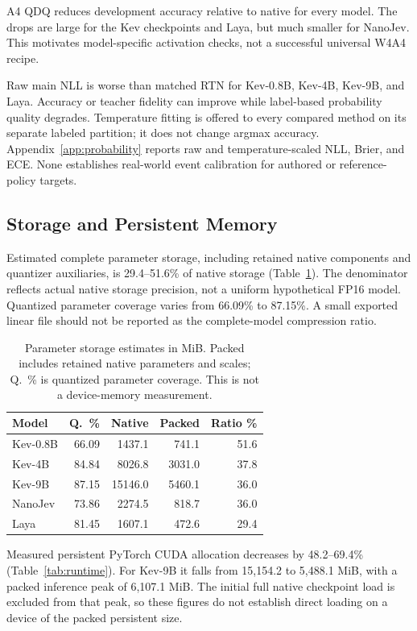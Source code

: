\documentclass[10pt,twocolumn]{article}
\begin{document}
A4 QDQ reduces development accuracy relative to native for every model.
The drops are large for the Kev checkpoints and Laya, but much smaller
for NanoJev. This motivates model-specific activation checks,
not a successful universal W4A4 recipe.

Raw main NLL is worse than matched RTN for Kev-0.8B, Kev-4B,
Kev-9B, and Laya. Accuracy or teacher fidelity can improve while
label-based probability quality degrades.
Temperature fitting is offered to every compared method on its
separate labeled partition; it does not change argmax accuracy.
Appendix~\ref{app:probability} reports raw and temperature-scaled NLL,
Brier, and ECE. None establishes real-world event
calibration for authored or reference-policy targets.

\subsection{Storage and Persistent Memory}
Estimated complete parameter storage, including retained native
components and quantizer auxiliaries, is 29.4--51.6\% of native
storage (Table~\ref{tab:storage}). The denominator reflects actual
native storage precision, not a uniform hypothetical FP16 model.
Quantized parameter coverage varies from 66.09\% to 87.15\%.
A small exported linear file should not be reported as the
complete-model compression ratio.

\begin{table}[t]
\centering\footnotesize
\setlength{\tabcolsep}{3pt}
\begin{tabular}{lrrrr}
\toprule
Model & Q.\ \% & Native & Packed & Ratio \%\\
\midrule
Kev-0.8B & 66.09 & 1437.1 & 741.1 & 51.6 \\
Kev-4B & 84.84 & 8026.8 & 3031.0 & 37.8 \\
Kev-9B & 87.15 & 15146.0 & 5460.1 & 36.0 \\
NanoJev & 73.86 & 2274.5 & 818.7 & 36.0 \\
Laya & 81.45 & 1607.1 & 472.6 & 29.4 \\
\bottomrule
\end{tabular}
\caption{Parameter storage estimates in MiB. Packed includes
retained native parameters and scales; Q.\ \% is quantized parameter
coverage. This is not a device-memory measurement.}
\label{tab:storage}
\end{table}

Measured persistent PyTorch CUDA allocation decreases by 48.2--69.4\%
(Table~\ref{tab:runtime}). For Kev-9B it falls from 15,154.2 to
5,488.1 MiB, with a packed inference peak of 6,107.1 MiB.
The initial full native checkpoint load is excluded from that peak,
so these figures do not establish direct loading on a device of
the packed persistent size.
\end{document}
